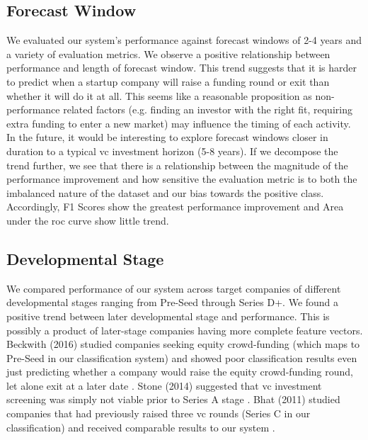\documentclass[../thesis/thesis.tex]{subfiles}
\begin{document}
\subsection{Forecast Window}

We evaluated our system's performance against forecast windows of 2-4 years and a variety of evaluation metrics. We observe a positive relationship between performance and length of forecast window. This trend suggests that it is harder to predict when a startup company will raise a funding round or exit than whether it will do it at all. This seems like a reasonable proposition as non-performance related factors (e.g. finding an investor with the right fit, requiring extra funding to enter a new market) may influence the timing of each activity. In the future, it would be interesting to explore forecast windows closer in duration to a typical \gls{vc} investment horizon (5-8 years). If we decompose the trend further, we see that there is a relationship between the magnitude of the performance improvement and how sensitive the evaluation metric is to both the imbalanced nature of the dataset and our bias towards the positive class. Accordingly, F1 Scores show the greatest performance improvement and Area under the \gls{roc} curve show little trend.

\subsection{Developmental Stage}

We compared performance of our system across target companies of different developmental stages ranging from Pre-Seed through Series D+. We found a positive trend between later developmental stage and performance. This is possibly a product of later-stage companies having more complete feature vectors. Beckwith (2016) studied companies seeking equity crowd-funding (which maps to Pre-Seed in our classification system) and showed poor classification results even just predicting whether a company would raise the equity crowd-funding round, let alone exit at a later date \cite{beckwith2016}. Stone (2014) suggested that \gls{vc} investment screening was simply not viable prior to Series A stage \cite{stone2014}. Bhat (2011) studied companies that had previously raised three \gls{vc} rounds (Series C in our classification) and received comparable results to our system \cite{bhat2011}.
\end{document}
